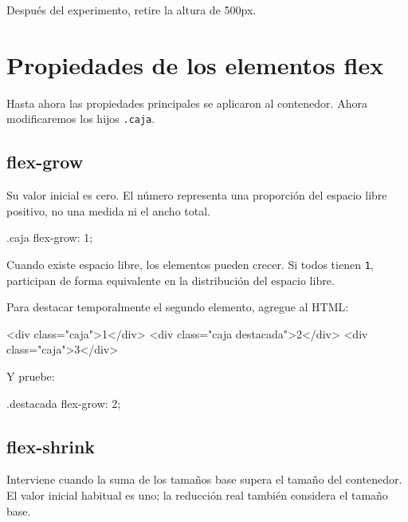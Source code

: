 \documentclass[11pt]{article}
\begin{document}
    Después del experimento, retire la altura de 500px.

    \section{Propiedades de los elementos flex}

    Hasta ahora las propiedades principales se aplicaron al contenedor. Ahora modificaremos los hijos \texttt{.caja}.

    \subsection{flex-grow}

    Su valor inicial es cero. El número representa una proporción del espacio libre positivo, no una medida ni el ancho total.

    \begin{csscodedark}
        .caja {
            flex-grow: 1;
        }
    \end{csscodedark}

    Cuando existe espacio libre, los elementos pueden crecer. Si todos tienen \texttt{1}, participan de forma equivalente en la distribución del espacio libre.

    Para destacar temporalmente el segundo elemento, agregue al HTML:

    \begin{htmlcodedark}
        <div class="caja">1</div>
        <div class="caja destacada">2</div>
        <div class="caja">3</div>
    \end{htmlcodedark}

    Y pruebe:

    \begin{csscodedark}
        .destacada {
            flex-grow: 2;
        }
    \end{csscodedark}


    \subsection{flex-shrink}

    Interviene cuando la suma de los tamaños base supera el tamaño del contenedor. El valor inicial habitual es uno; la reducción real también considera el tamaño base.
\end{document}
